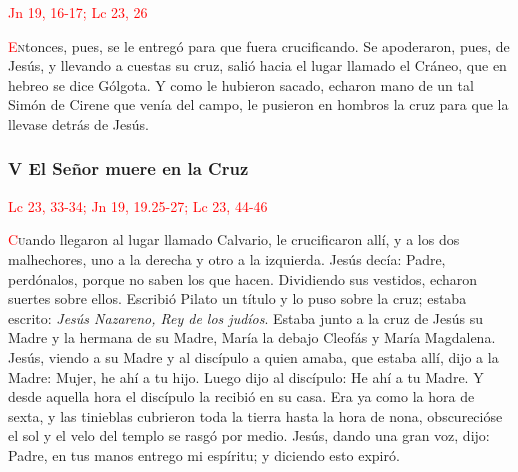 \documentclass[10pt,twoside]{book}
\begin{document}
\vspace{-0.5em}

\hfill\textcolor{red}{Jn 19, 16-17; Lc 23, 26}

\lettrine[lines=2]{\textcolor{red}{E}}ntonces, pues, se le entregó para que fuera crucificando. Se apoderaron, pues, de Jesús, y llevando a cuestas su cruz, 
salió hacia el lugar llamado el Cráneo, que en hebreo se dice Gólgota. Y como le hubieron sacado, echaron mano de un tal Simón de Cirene que venía del campo, 
le pusieron en hombros la cruz para que la llevase detrás de Jesús.

\vspace{0.5em}



\vspace{1.5em}

\noindent\subsubsection*{V El Señor muere en la Cruz}

\vspace{-0.5em}

\hfill\textcolor{red}{Lc 23, 33-34; Jn 19, 19.25-27; Lc 23, 44-46}

\lettrine[lines=2]{\textcolor{red}{C}}uando llegaron al lugar llamado Calvario, le crucificaron allí, y a los dos malhechores, uno a la derecha y otro a la izquierda. 
Jesús decía: Padre, perdónalos, porque no saben los que hacen. Dividiendo sus vestidos, echaron suertes sobre ellos. Escribió Pilato un título y lo puso sobre la cruz;
estaba escrito: \textit{Jesús Nazareno, Rey de los judíos}. Estaba junto a la cruz de Jesús su Madre y la hermana de su Madre, María la debajo Cleofás y María Magdalena.
Jesús, viendo a su Madre y al discípulo a quien amaba, que estaba allí, dijo a la Madre: Mujer, he ahí a tu hijo. Luego dijo al discípulo: He ahí a tu Madre.
Y desde aquella hora el discípulo la recibió en su casa. Era ya como la hora de sexta, y las tinieblas cubrieron toda la tierra hasta la hora de nona,
obscurecióse el sol y el velo del templo se rasgó por medio. Jesús, dando una gran voz, dijo: Padre, en tus manos entrego mi espíritu; y diciendo esto expiró.

\vspace{0.5em}

{}

\iralfinal

\vspace{0.5em}
\end{document}
